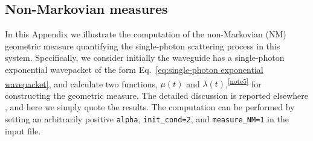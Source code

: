 \documentclass[12pt,letter,onecolumn,notitlepage]{article}
\begin{document}
\begin{appendices}
\section{Non-Markovian measures}
\label{append: NM}
In this Appendix we illustrate the computation of the non-Markovian (NM) geometric measure \cite{LorenzoPRA13} quantifying the single-photon scattering process in this system. Specifically, we consider initially the waveguide has a single-photon exponential wavepacket of the form Eq.~\eqref{eq:single-photon exponential wavepacket}, and calculate two functions, $\mu(t)$ and $\lambda(t)$,\textsuperscript{\ref{note5}} for constructing the geometric measure. The detailed discussion is reported elsewhere \cite{FangNM17}, and here we simply quote the results. The computation can be performed by setting an arbitrarily positive \texttt{alpha}, \texttt{init\_cond=2}, and \texttt{measure\_NM=1} in the input file.



\end{appendices}
\end{document}
